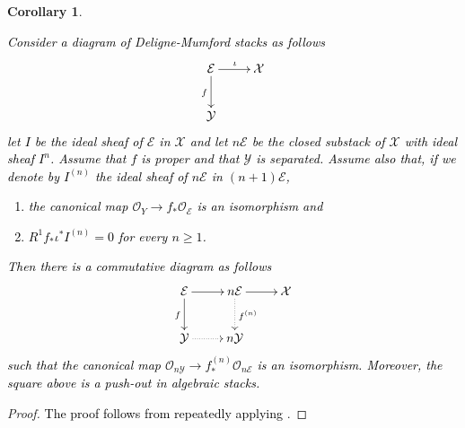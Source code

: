 \documentclass{amsart}
\newcommand{\cE}{\mathcal{E}}
\newcommand{\cO}{\mathcal{O}}
\newcommand{\cX}{\mathcal{X}}
\newcommand{\cY}{\mathcal{Y}}
\newtheorem{Cor}[theorem]{Corollary}
\theoremstyle{definition}
\begin{document}
\begin{Cor}\label{cor_induction_for_thickenings}\textcolor{black}{Consider a diagram of Deligne-Mumford stacks as follows$$\xymatrix{\cE\ar[d]_f\ar[r]^\iota & \cX\\\cY & }$$let $I$ be the ideal sheaf of $\cE$ in $\cX$ and let $n\cE$ be the closed substack of $\cX$ with ideal sheaf $I^n$. Assume that $f$ is proper and that $\cY$ is separated.
Assume also that, if we denote by $I^{(n)}$ the ideal sheaf of $n\cE$ in $(n+1)\cE$, \begin{enumerate}
    \item the canonical map $\cO_Y\to f_*\cO_\cE$ is an isomorphism and \item$R^1f_*\iota^*I^{(n)}=0$ for every $n\ge 1$.
\end{enumerate} Then there is a commutative diagram as follows$$\xymatrix{\cE\ar[r] \ar[d]_f & n\cE\ar@{..>}[d]^{f^{(n)}}\ar[r] & \cX \\ \cY\ar@{..>}[r] & n\cY &}$$
such that the canonical map $\cO_{n\cY}\to f^{(n)}_*\cO_{n\cE}$ is an isomorphism. Moreover, the square above is a push-out in algebraic stacks.
}
\end{Cor}
\begin{proof}
    \textcolor{black}{The proof follows from repeatedly applying }.
\end{proof}
\end{document}
